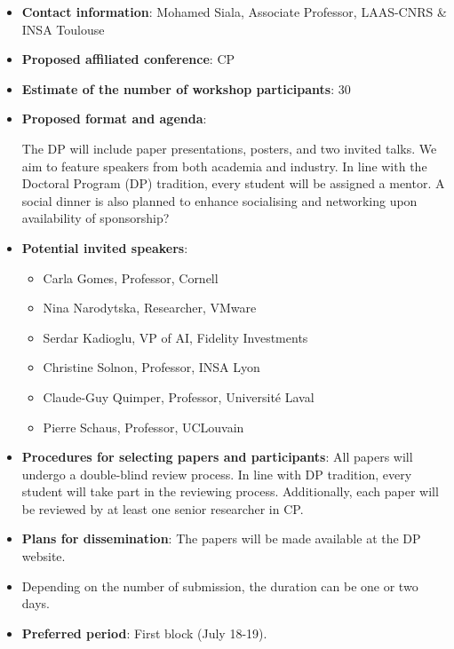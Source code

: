 \documentclass[12pt,a4paper]{article}
\begin{document}
\begin{itemize}
	\item \textbf{Contact information}: Mohamed Siala, Associate Professor, LAAS-CNRS \& INSA Toulouse
	\item \textbf{Proposed affiliated conference}: CP
	\item \textbf{Estimate of the number of workshop participants}: 30
	\item \textbf{Proposed format and agenda}:

	      The DP will include paper presentations,
	      posters, and two invited talks.
	      We aim to feature speakers from both
	      academia and industry.
	      In line with the Doctoral Program (DP) tradition,
	      every student will be assigned a mentor.
	      A social dinner is also planned to enhance socialising and networking upon availability of sponsorship?


	\item \textbf{Potential invited speakers}:
	      \begin{itemize}
		      \item Carla Gomes, Professor, Cornell
		      \item Nina Narodytska, Researcher, VMware
		      \item Serdar Kadioglu, VP of AI, Fidelity Investments
		      \item Christine Solnon, Professor, INSA Lyon
		      \item Claude-Guy Quimper, Professor, Université Laval
		      \item Pierre Schaus, Professor, UCLouvain

	      \end{itemize}

	\item \textbf{Procedures for selecting papers and participants}:
	      All papers will undergo a double-blind review process.
	      In line with DP tradition, every student will take part in the reviewing process.
	      Additionally, each paper will be reviewed by at least one senior researcher in CP.


	\item \textbf{Plans for dissemination}: The papers will be made available at the DP website.
	\item Depending on the number of submission, the duration can be one or two days.
	\item \textbf{Preferred period}: First block (July 18-19).

\end{itemize}
\end{document}
